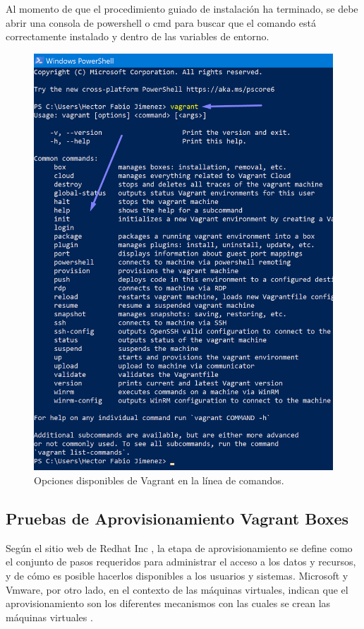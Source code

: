 \documentclass[letterpaper, 12pt, oneside]{article}
\begin{document}
    Al momento de que el procedimiento guiado de instalación ha terminado, se debe abrir una consola de powershell o cmd para buscar que el comando está correctamente instalado y dentro de las variables de entorno.
    \begin{center}
    \begin{figure}[H]
        \includegraphics[scale=1.0]{img/install/vagrant6.png}
        \caption{Opciones disponibles de Vagrant en la línea de comandos.}
        \label{fig:va6}
    \end{figure}
    \end{center}
    
    \subsection{Pruebas de Aprovisionamiento Vagrant Boxes}
    Según el sitio web de Redhat Inc \cite{provisioning}, la etapa de aprovisionamiento se define como el conjunto de pasos requeridos para administrar el acceso a los datos y recursos, y de cómo es posible hacerlos disponibles a los usuarios y sistemas\cite{provisioning}. Microsoft y Vmware, por otro lado, en el contexto de las máquinas virtuales, indican que el aprovisionamiento son los diferentes mecanismos con las cuales se crean las máquinas virtuales \cite{provisioning2}\cite{provisioning3}.
    
\end{document}
